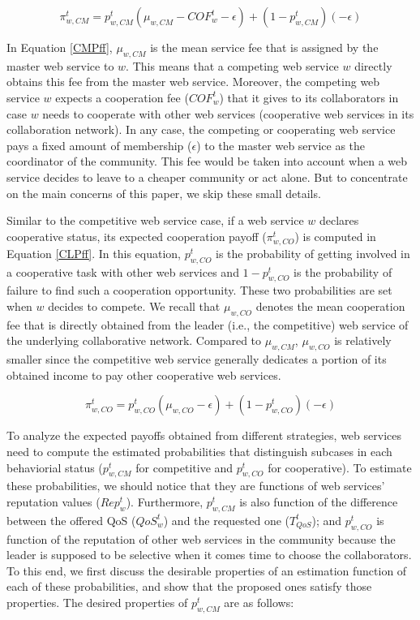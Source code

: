 \documentclass[fleqn]{singlecol-new}
\begin{document}
\begin{equation}\label{CMPff}
\pi_{w,CM}^t=p_{w,CM}^t(\mu_{w,
CM}-COF_w^t-\epsilon)+(1-p_{w,CM}^t)(-\epsilon)
\end{equation}

In Equation \ref{CMPff}, $\mu_{w, CM}$ is the mean service fee
that is assigned by the master web service to $w$. This means that
a competing web service $w$ directly obtains this fee from the
master web service. Moreover, the competing web service $w$
expects a cooperation fee ($COF_w^t$) that it gives to its
collaborators in case $w$ needs to cooperate with other web
services (cooperative web services in its collaboration network).
In any case, the competing or cooperating web service pays a fixed
amount of membership ($\epsilon$) to the master web service as the
coordinator of the community. This fee would be taken into account
when a web service decides to leave to a cheaper community or act
alone. But to concentrate on the main concerns of this paper, we
skip these small details.


Similar to the competitive web service case, if a web service $w$
declares cooperative status, its expected cooperation payoff
($\pi_{w,CO}^t$) is computed in Equation \ref{CLPff}. In this
equation, $p_{w,CO}^t$ is the probability of getting involved in a
cooperative task with other web services and $1-p_{w,CO}^t$ is the
probability of failure to find such a cooperation opportunity.
These two probabilities are set when $w$ decides to compete. We
recall that $\mu_{w, CO}$ denotes the mean cooperation fee that is
directly obtained from the leader (i.e., the competitive) web
service of the underlying collaborative network. Compared to
$\mu_{w, CM}$, $\mu_{w, CO}$ is relatively smaller since the
competitive web service generally dedicates a portion of its
obtained income to pay other cooperative web services.


\begin{equation}\label{CLPff}
\pi_{w,CO}^t=p_{w,CO}^t (\mu_{w,
CO}-\epsilon)+(1-p_{w,CO}^t)(-\epsilon)
\end{equation}


To analyze the expected payoffs obtained from different
strategies, web services need to compute the estimated
probabilities that distinguish subcases in each behaviorial status
($p_{w,CM}^t$ for competitive and $p_{w,CO}^t$ for cooperative).
To estimate these probabilities, we should notice that they are
functions of web services' reputation values ($Rep_w^t$).
Furthermore, $p_{w,CM}^t$ is also function of the difference
between the offered QoS ($QoS_w^t$) and the requested one
($T_{QoS}^t$); and $p_{w,CO}^t$ is function of the reputation of
other web services in the community because the leader is supposed
to be selective when it comes time to choose the collaborators. To
this end, we first discuss the desirable properties of an
estimation function of each of these probabilities, and show that
the proposed ones satisfy those properties. The desired properties
of $p_{w,CM}^t$ are as follows:
\\
\end{document}
